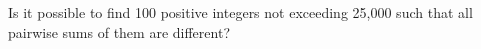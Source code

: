 Is it possible to find 100 positive integers not exceeding 25,000 such that all pairwise sums of them are different?
